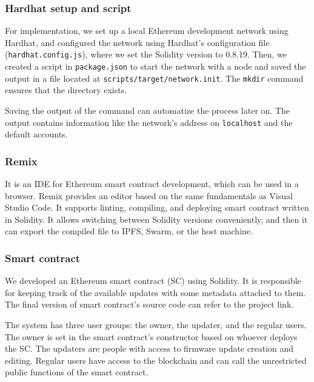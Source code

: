 \documentclass[conference]{IEEEtran}
\begin{document}


\subsubsection{Hardhat setup and script}

For implementation, we set up a local Ethereum development network using Hardhat, and configured the network using Hardhat's configuration file (\texttt{hardhat.config.js}), where we set the Solidity version to 0.8.19. Then, we created a script in \texttt{package.json} to start the network with a node and saved the output in a file located at \texttt{scripts/target/network.init}. The \texttt{mkdir} command ensures that the directory exists.

Saving the output of the command can automatize the process later on. The output contains information like the network's address on \texttt{localhost} and the default accounts.

\subsubsection{Remix}
It is an IDE for Ethereum smart contract development, which can be used in a browser. Remix provides an editor based on the same fundamentals as Visual Studio Code. It supports linting, compiling, and deploying smart contract written in Solidity. It allows switching between Solidity versions conveniently, and then it can export the compiled file to IPFS, Swarm, or the host machine.


\subsubsection{Smart contract}

We developed an Ethereum smart contract (SC) using Solidity. It is responsible for keeping track of the available updates with some metadata attached to them. The final version of smart contract's source code can refer to the project link.

The system has three user groups: the owner, the updater, and the regular users. The owner is set in the smart contract's constructor based on whoever deploys the SC. The updaters are people with access to firmware update creation and editing. Regular users have access to the blockchain and can call the unrestricted public functions of the smart contract.
\end{document}
